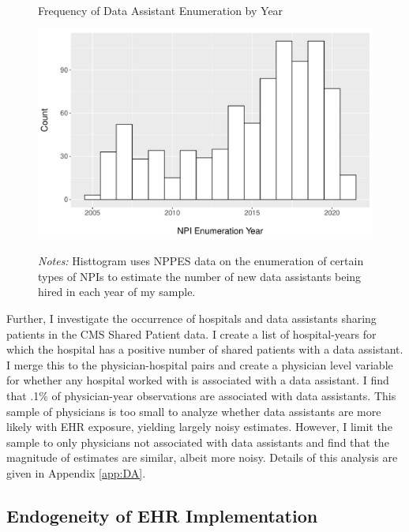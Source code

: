 \documentclass[12pt]{article}
\begin{document}
\begin{figure}[t]
\centering
\captionsetup{width=.5\linewidth}
\caption{Frequency of Data Assistant Enumeration by Year}
\includegraphics[scale=.5]{Objects/dataassistant_histogram.pdf}
\label{fig:dataassistant_histogram}
\vspace{2mm}
    \caption*{\footnotesize{\textit{Notes:} Histtogram uses NPPES data on the enumeration of certain types of NPIs to estimate the number of new data assistants being hired in each year of my sample.}}
\end{figure}

Further, I investigate the occurrence of hospitals and data assistants sharing patients in the CMS Shared Patient data. I create a list of hospital-years for which the hospital has a positive number of shared patients with a data assistant. I merge this to the physician-hospital pairs and create a physician level variable for whether any hospital worked with is associated with a data assistant. I find that .1\% of physician-year observations are associated with data assistants. This sample of physicians is too small to analyze whether data assistants are more likely with EHR exposure, yielding largely noisy estimates. However, I limit the sample to only physicians not associated with data assistants and find that the magnitude of estimates are similar, albeit more noisy. Details of this analysis are given in Appendix \ref{app:DA}. 

\subsection{Endogeneity of EHR Implementation}\label{sec:endogeneity}
\end{document}

